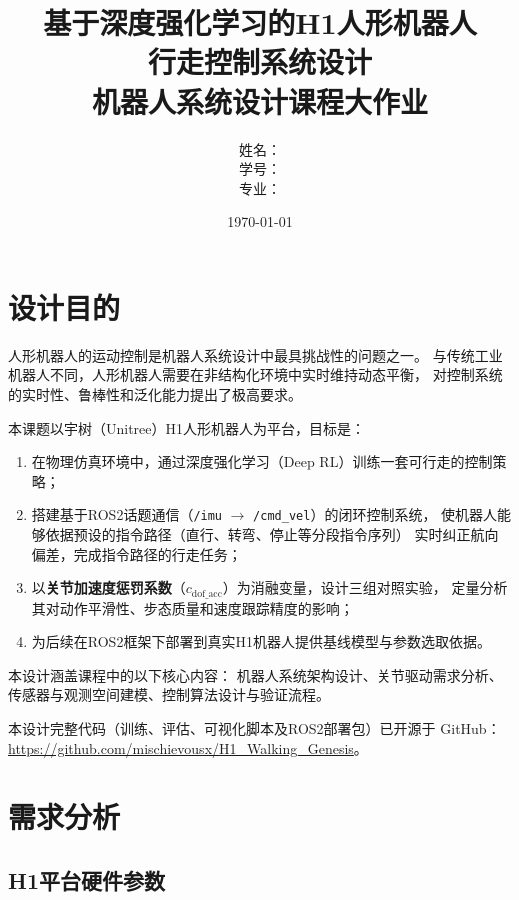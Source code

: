 \documentclass[12pt, a4paper]{article}
\title{
    \vspace{2cm}
    \textbf{\Large 基于深度强化学习的H1人形机器人\\行走控制系统设计}\\[1cm]
    \large 机器人系统设计课程大作业
    \vspace{1cm}
}
\author{
    姓名：\underline{\hspace{4cm}} \\[0.5em]
    学号：\underline{\hspace{4cm}} \\[0.5em]
    专业：\underline{\hspace{4cm}}
}
\date{\today}
\begin{document}
\maketitle
\thispagestyle{empty}
\newpage

\tableofcontents
\newpage

\section{设计目的}

人形机器人的运动控制是机器人系统设计中最具挑战性的问题之一。
与传统工业机器人不同，人形机器人需要在非结构化环境中实时维持动态平衡，
对控制系统的实时性、鲁棒性和泛化能力提出了极高要求。

本课题以宇树（Unitree）H1人形机器人为平台，目标是：

\begin{enumerate}[label=(\arabic*)]
    \item 在物理仿真环境中，通过深度强化学习（Deep RL）训练一套可行走的控制策略；
    \item 搭建基于ROS2话题通信（\texttt{/imu} $\to$ \texttt{/cmd\_vel}）的闭环控制系统，
          使机器人能够依据预设的指令路径（直行、转弯、停止等分段指令序列）
          实时纠正航向偏差，完成指令路径的行走任务；
    \item 以\textbf{关节加速度惩罚系数}（$c_\text{dof\_acc}$）为消融变量，设计三组对照实验，
          定量分析其对动作平滑性、步态质量和速度跟踪精度的影响；
    \item 为后续在ROS2框架下部署到真实H1机器人提供基线模型与参数选取依据。
\end{enumerate}

本设计涵盖课程中的以下核心内容：
机器人系统架构设计、关节驱动需求分析、传感器与观测空间建模、控制算法设计与验证流程。

本设计完整代码（训练、评估、可视化脚本及ROS2部署包）已开源于 GitHub：
\url{https://github.com/mischievousx/H1_Walking_Genesis}。


\section{需求分析}

\subsection{H1平台硬件参数}
\end{document}
